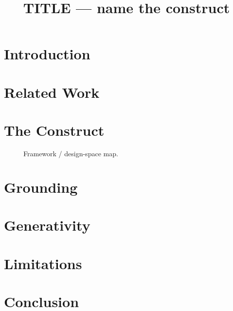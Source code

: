 \documentclass[sigconf,review,anonymous]{acmart}
\begin{document}
\title{TITLE — name the construct}
\begin{abstract}\end{abstract}
\maketitle
\section{Introduction}        %
\section{Related Work}
\section{The Construct}       %
\begin{figure}[t]\centering\caption{Framework / design-space map.}\end{figure}
\section{Grounding}           %
\section{Generativity}        %
\section{Limitations}
\section{Conclusion}

\end{document}
